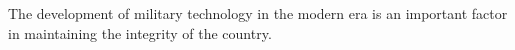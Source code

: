The development of military technology in the modern era is an important factor in maintaining the integrity of the country. 
